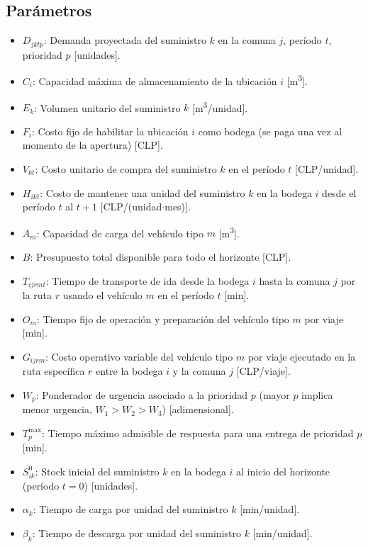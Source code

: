 \documentclass[letterpaper]{article}
\begin{document}
\begin{flushleft}
\subsection{Parámetros}

\begin{itemize}[leftmargin=2em, itemsep=1pt]
  \item $D_{jktp}$: Demanda proyectada del suministro $k$ en la comuna $j$, período $t$, prioridad $p$ [unidades].
  \item $C_i$: Capacidad máxima de almacenamiento de la ubicación $i$ [m\textsuperscript{3}].
  \item $E_k$: Volumen unitario del suministro $k$ [m\textsuperscript{3}/unidad].
  \item $F_i$: Costo fijo de habilitar la ubicación $i$ como bodega (se paga una vez al momento de la apertura) [CLP].
  \item $V_{kt}$: Costo unitario de compra del suministro $k$ en el período $t$ [CLP/unidad].
  \item $H_{ikt}$: Costo de mantener una unidad del suministro $k$ en la bodega $i$ desde el período $t$ al $t+1$ [CLP/(unidad$\cdot$mes)].
  \item $A_m$: Capacidad de carga del vehículo tipo $m$ [m\textsuperscript{3}].
  \item $B$: Presupuesto total disponible para todo el horizonte [CLP].
  \item $T_{ijrmt}$: Tiempo de transporte de ida desde la bodega $i$ hasta la comuna $j$ por la ruta $r$ usando el vehículo $m$ en el período $t$ [min].
  \item $O_m$: Tiempo fijo de operación y preparación del vehículo tipo $m$ por viaje [min].
  \item $G_{ijrm}$: Costo operativo variable del vehículo tipo $m$ por viaje ejecutado en la ruta específica $r$ entre la bodega $i$ y la comuna $j$ [CLP/viaje].
  \item $W_p$: Ponderador de urgencia asociado a la prioridad $p$ (mayor $p$ implica menor urgencia, $W_1 > W_2 > W_3$) [adimensional].
  \item $T^{\max}_p$: Tiempo máximo admisible de respuesta para una entrega de prioridad $p$ [min].
  \item $S^0_{ik}$: Stock inicial del suministro $k$ en la bodega $i$ al inicio del horizonte (período $t=0$) [unidades].
  \item $\alpha_k$: Tiempo de carga por unidad del suministro $k$ [min/unidad].
  \item $\beta_k$: Tiempo de descarga por unidad del suministro $k$ [min/unidad].

\end{itemize}
\end{flushleft}
\end{document}
